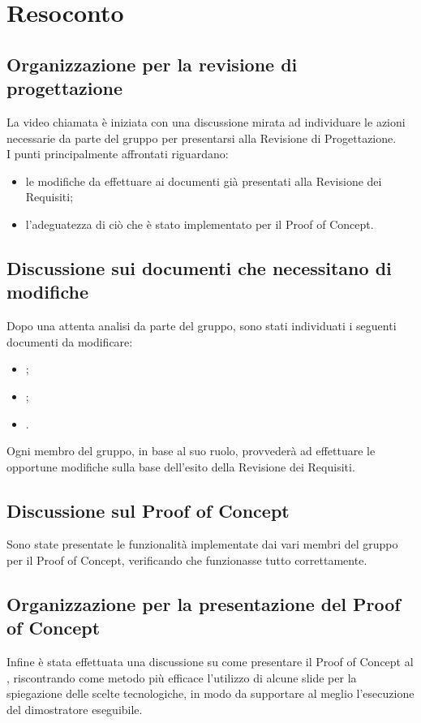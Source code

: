 \section{Resoconto}
\subsection{Organizzazione per la revisione di progettazione}
La video chiamata è iniziata con una discussione mirata ad individuare le azioni necessarie da parte del gruppo per presentarsi alla Revisione di Progettazione. \\
I punti principalmente affrontati riguardano:
\begin{itemize}
\item le modifiche da effettuare ai documenti già presentati alla Revisione dei Requisiti;
\item l'adeguatezza di ciò che è stato implementato per il Proof of Concept.
\end{itemize}
\subsection{Discussione sui documenti che necessitano di modifiche}
Dopo una attenta analisi da parte del gruppo, sono stati individuati i seguenti documenti da modificare:
\begin{itemize}
\item {};
\item {};
\item {}.
\end{itemize}
Ogni membro del gruppo, in base al suo ruolo, provvederà ad effettuare le opportune modifiche sulla base dell'esito della Revisione dei Requisiti.
\subsection{Discussione sul Proof of Concept}
Sono state presentate le funzionalità implementate dai vari membri del gruppo per il Proof of Concept, verificando che funzionasse tutto correttamente.
\subsection{Organizzazione per la presentazione del Proof of Concept}
Infine è stata effettuata una discussione su come presentare il Proof of Concept al \CR , riscontrando come metodo più efficace l'utilizzo di alcune slide per la spiegazione delle scelte tecnologiche, in modo da supportare al meglio l'esecuzione del dimostratore eseguibile.